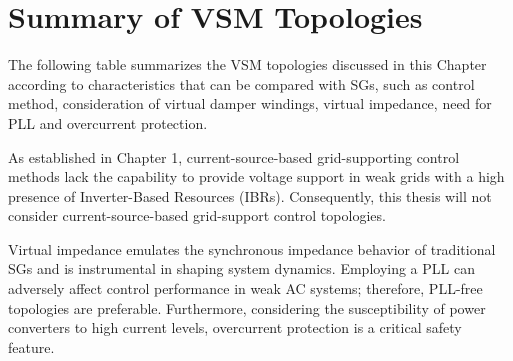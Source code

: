 \newpage
\section{Summary of VSM Topologies}

The following table summarizes the VSM topologies discussed in this Chapter
according to characteristics that can be compared with SGs, such as control
method, consideration of virtual damper windings, virtual impedance, need for
PLL and overcurrent protection. 

\begin{table}[ht!]
    \centering
    \caption{\centering Summary of VSM topologies.}
    \label{tab:topologies_summary}
\end{table}

As established in Chapter 1, current-source-based grid-supporting control
methods lack the capability to provide voltage support in weak grids with a high
presence of Inverter-Based Resources (IBRs). Consequently, this thesis will not
consider current-source-based grid-support control topologies.

Virtual impedance emulates the synchronous impedance behavior of traditional SGs
and is instrumental in shaping system dynamics. Employing a PLL can adversely
affect control performance in weak AC systems; therefore, PLL-free topologies
are preferable. Furthermore, considering the susceptibility of power converters
to high current levels, overcurrent protection is a critical safety feature.

